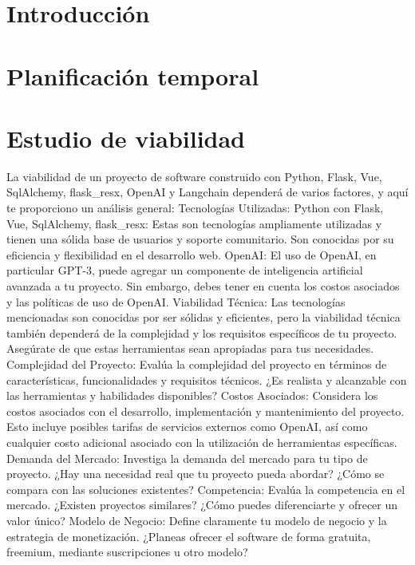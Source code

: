 
\section{Introducción}

\section{Planificación temporal}

\section{Estudio de viabilidad}
La viabilidad de un proyecto de software construido con Python, Flask, Vue, SqlAlchemy, flask_resx, OpenAI y Langchain dependerá de varios factores, y aquí te proporciono un análisis general:
Tecnologías Utilizadas:
Python con Flask, Vue, SqlAlchemy, flask_resx: Estas son tecnologías ampliamente utilizadas y tienen una sólida base de usuarios y soporte comunitario. Son conocidas por su eficiencia y flexibilidad en el desarrollo web.
OpenAI: El uso de OpenAI, en particular GPT-3, puede agregar un componente de inteligencia artificial avanzada a tu proyecto. Sin embargo, debes tener en cuenta los costos asociados y las políticas de uso de OpenAI.
Viabilidad Técnica:
Las tecnologías mencionadas son conocidas por ser sólidas y eficientes, pero la viabilidad técnica también dependerá de la complejidad y los requisitos específicos de tu proyecto. Asegúrate de que estas herramientas sean apropiadas para tus necesidades.
Complejidad del Proyecto:
Evalúa la complejidad del proyecto en términos de características, funcionalidades y requisitos técnicos. ¿Es realista y alcanzable con las herramientas y habilidades disponibles?
Costos Asociados:
Considera los costos asociados con el desarrollo, implementación y mantenimiento del proyecto. Esto incluye posibles tarifas de servicios externos como OpenAI, así como cualquier costo adicional asociado con la utilización de herramientas específicas.
Demanda del Mercado:
Investiga la demanda del mercado para tu tipo de proyecto. ¿Hay una necesidad real que tu proyecto pueda abordar? ¿Cómo se compara con las soluciones existentes?
Competencia:
Evalúa la competencia en el mercado. ¿Existen proyectos similares? ¿Cómo puedes diferenciarte y ofrecer un valor único?
Modelo de Negocio:
Define claramente tu modelo de negocio y la estrategia de monetización. ¿Planeas ofrecer el software de forma gratuita, freemium, mediante suscripciones u otro modelo?
